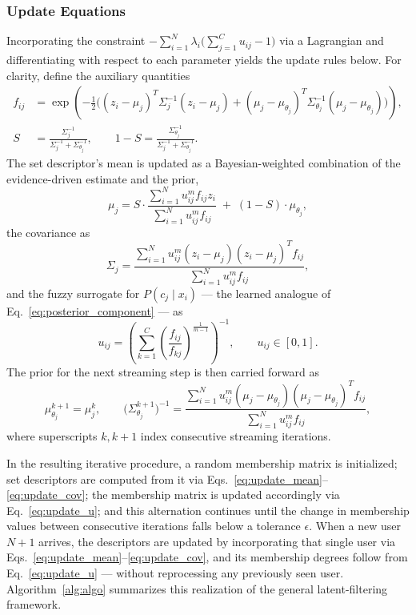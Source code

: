 \documentclass{article}
\theoremstyle{plain}
\theoremstyle{definition}
\theoremstyle{remark}
\begin{document}
\subsubsection{Update Equations}

Incorporating the constraint $-\sum_{i=1}^{N} \lambda_i \big(\sum_{j=1}^{C} u_{ij} - 1\big)$ via a Lagrangian and differentiating with respect to each parameter yields the update rules below. For clarity, define the auxiliary quantities
\begin{align}
	f_{ij} &= \exp\!\left( -\frac{1}{2} \Big( (z_i - \mu_j)^T \Sigma_j^{-1} (z_i - \mu_j) + (\mu_j - \mu_{\theta_j})^T \Sigma_{\theta_j}^{-1} (\mu_j - \mu_{\theta_j}) \Big) \right), \label{eq:aux_f} \\
	S &= \frac{\Sigma_j^{-1}}{\Sigma_j^{-1} + \Sigma_{\theta_j}^{-1}}, \qquad 1 - S = \frac{\Sigma_{\theta_j}^{-1}}{\Sigma_j^{-1} + \Sigma_{\theta_j}^{-1}}. \label{eq:aux_S}
\end{align}
The set descriptor's mean is updated as a Bayesian-weighted combination of the evidence-driven estimate and the prior,
\begin{equation}
	\label{eq:update_mean}
	\mu_j = S \cdot \frac{\sum_{i=1}^{N} u_{ij}^m f_{ij} z_i}{\sum_{i=1}^{N} u_{ij}^m f_{ij}} \;+\; (1 - S) \cdot \mu_{\theta_j},
\end{equation}
the covariance as
\begin{equation}
	\label{eq:update_cov}
	\Sigma_j = \frac{\sum_{i=1}^{N} u_{ij}^m (z_i - \mu_j)(z_i - \mu_j)^T f_{ij}}{\sum_{i=1}^{N} u_{ij}^m f_{ij}},
\end{equation}
and the fuzzy surrogate for $P(c_j \mid x_i)$ — the learned analogue of Eq.~\eqref{eq:posterior_component} — as
\begin{equation}
	\label{eq:update_u}
	u_{ij} = \left( \sum_{k=1}^{C} \left( \frac{f_{ij}}{f_{kj}} \right)^{\frac{1}{m-1}} \right)^{-1}, \qquad u_{ij} \in [0,1].
\end{equation}
The prior for the next streaming step is then carried forward as
\begin{equation}
	\label{eq:update_prior}
	\mu_{\theta_j}^{k+1} = \mu_j^{k}, \qquad \big(\Sigma_{\theta_j}^{k+1}\big)^{-1} = \frac{\sum_{i=1}^{N} u_{ij}^m (\mu_j - \mu_{\theta_j}) (\mu_j - \mu_{\theta_j})^T f_{ij}}{\sum_{i=1}^{N} u_{ij}^m f_{ij}},
\end{equation}
where superscripts $k, k+1$ index consecutive streaming iterations.

In the resulting iterative procedure, a random membership matrix is initialized; set descriptors are computed from it via Eqs.~\eqref{eq:update_mean}--\eqref{eq:update_cov}; the membership matrix is updated accordingly via Eq.~\eqref{eq:update_u}; and this alternation continues until the change in membership values between consecutive iterations falls below a tolerance $\epsilon$. When a new user $N+1$ arrives, the descriptors are updated by incorporating that single user via Eqs.~\eqref{eq:update_mean}--\eqref{eq:update_cov}, and its membership degrees follow from Eq.~\eqref{eq:update_u} — without reprocessing any previously seen user. Algorithm~\ref{alg:algo} summarizes this realization of the general latent-filtering framework.
\end{document}
